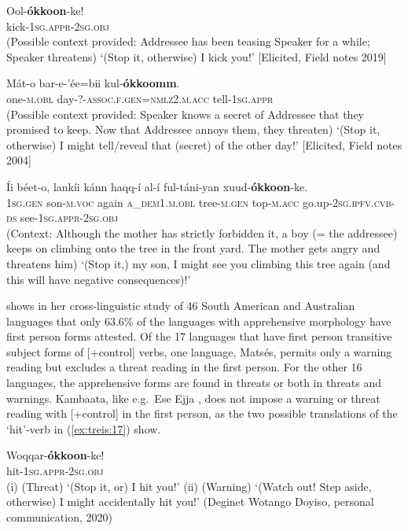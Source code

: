 \documentclass[output=paper,colorlinks,citecolor=brown,
]{langsci/langscibook}
\begin{document}
\ea\label{ex:treis:14} 
\gll Ool-\textbf{ókkoon}-ke! \\
kick-\textsc{1sg.appr-2sg.obj}\\
\glt (Possible context provided: Addressee has been teasing Speaker for a while; Speaker threatens) `(Stop it, otherwise) I kick you!' [Elicited, Field notes 2019]
\z 

\ea\label{ex:treis:15} 
\gll Mát-o 		bar-e-'ée=bii 					kul-\textbf{ókkoomm}. \\
one-\textsc{m.obl}	day-?-\textsc{assoc.f.gen=nmlz2.m.acc} tell-\textsc{1sg.appr}\\
\glt (Possible context provided: Speaker knows a secret of Addressee that they promised to keep. Now that Addressee annoys them, they threaten) `(Stop it, otherwise) I might tell/reveal that (secret) of the other day!'  [Elicited, Field notes 2004]
\z 

\ea\label{ex:treis:16} 
\gll Íi			béet-o,		lankíi	kánn					haqq-í			al-í ful-táni-yan			xuud-\textbf{ókkoon}-ke. \\
\textsc{1sg.gen} son-\textsc{m.voc}	again	\textsc{a\_dem1.m.obl}	tree-\textsc{m.gen}	top-\textsc{m.acc} go.up-\textsc{2sg.ipfv.cvb-ds} see-\textsc{1sg.appr-2sg.obj}\\
\glt (Context: Although the mother has strictly forbidden it, a boy (= the addressee) keeps on climbing onto the tree in the front yard. The mother gets angry and threatens him) `(Stop it,) my son, I might see you climbing this tree again (and this will have negative consequences)!'  \citep[4.45]{KEB1989}
\z

\citet{vuillermet2018a} shows in her cross-linguistic study of 46 South American and Australian languages that only 63.6\% of the languages with apprehensive morphology have first person forms attested. Of the 17 languages that have first person transitive subject forms of [+control] verbs, one language, Matsés, permits only a warning reading but excludes a threat reading in the first person. For the other 16 languages, the apprehensive forms are found in threats or both in threats and warnings. Kambaata, like  e.g.\ Ese Ejja \citep[273--274]{vuillermet2018a}, does not impose a warning or threat reading with [+control] in the first person, as the two possible translations of the `hit'-verb in (\ref{ex:treis:17}) show.

\ea\label{ex:treis:17} 
\gll Woqqar-\textbf{ókkoon}-ke! \\
hit-\textsc{1sg.appr-2sg.obj}\\
\glt (i)	(Threat) `(Stop it, or) I  hit you!' \newline
(ii)	(Warning) `(Watch out! Step aside, otherwise) I might accidentally hit you!' (Deginet Wotango Doyiso, personal communication, 2020)
\z
\end{document}
